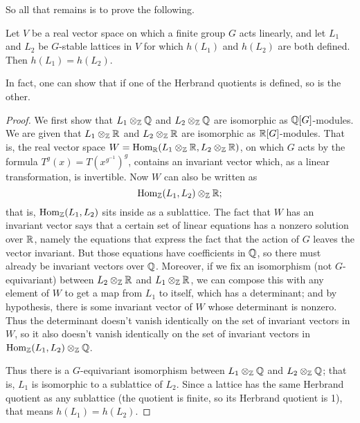 So all that remains is to prove the following.
\begin{lemma}
Let $V$ be a real vector space on which a finite group $G$ acts linearly,
and let $L_1$ and $L_2$ be $G$-stable lattices in $V$ for which
$h(L_1)$ and $h(L_2)$ are both defined. Then $h(L_1) = h(L_2)$.
\end{lemma}
In fact, one can show that if one of the Herbrand quotients is defined, so
is the other.
\begin{proof}
We first show that $L_1 \otimes_{\mathbb{Z}} \mathbb{Q}$ and $L_2 \otimes_{\mathbb{Z}} \mathbb{Q}$
are isomorphic as $\mathbb{Q}[G]$-modules. We are given that $L_1 \otimes_{\mathbb{Z}} \mathbb{R}$
and $L_2 \otimes_{\mathbb{Z}} \mathbb{R}$ are isomorphic as $\mathbb{R}[G]$-modules.
That is, the real vector space $W = \operatorname{Hom}_{\mathbb{R}}(L_1 \otimes_{\mathbb{Z}} \mathbb{R},
L_2 \otimes_{\mathbb{Z}}
\mathbb{R})$, on which $G$ acts by the formula $T^g(x) = T(x^{g^{-1}})^g$, contains an invariant vector which, as a linear
transformation, is invertible. Now $W$ can also be written as
\[
\operatorname{Hom}_{\mathbb{Z}}(L_1, L_2) \otimes_{\mathbb{Z}} \mathbb{R};
\]
that is, $\operatorname{Hom}_{\mathbb{Z}}(L_1, L_2)$ sits inside as a sublattice. The fact that
$W$ has an invariant vector says that a certain set of linear equations
has a nonzero solution over $\mathbb{R}$, namely the equations that express
the fact that the action of $G$ leaves the vector invariant. But those
equations have coefficients in $\mathbb{Q}$, so there must already be invariant
vectors over $\mathbb{Q}$. Moreover, if we fix an isomorphism (not $G$-equivariant)
between $L_2 \otimes_{\mathbb{Z}} \mathbb{R}$ and $L_1 \otimes_{\mathbb{Z}} \mathbb{R}$, we can
compose this with any element of $W$ to get a map from $L_1$ to itself,
which has a determinant; and by hypothesis, there is some invariant
vector of $W$ whose determinant is nonzero. Thus the determinant
doesn't vanish identically on the set of invariant vectors in $W$,
so it also doesn't vanish identically on the set of invariant vectors in
$\operatorname{Hom}_{\mathbb{Z}}(L_1, L_2) \otimes_{\mathbb{Z}} \mathbb{Q}$.

Thus there is a $G$-equivariant isomorphism between $L_1 \otimes_{\mathbb{Z}} \mathbb{Q}$
and $L_2 \otimes_{\mathbb{Z}} \mathbb{Q}$; that is, $L_1$ is isomorphic to a sublattice of
$L_2$. Since a lattice has the same Herbrand quotient as any sublattice
(the quotient is finite, so its Herbrand quotient is 1), that means
$h(L_1) = h(L_2)$.
\end{proof}


